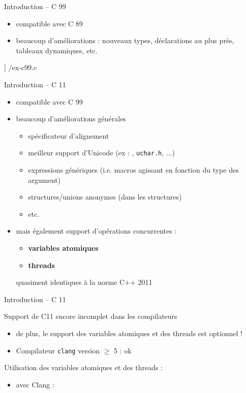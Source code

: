\begin {frame} [fragile] {Introduction -- C 99}
    \begin {itemize}
	\item compatible avec C 89
	\item beaucoup d'améliorations : nouveaux types, déclarations
	    au plus près, tableaux dynamiques, etc.
    \end {itemize}

    \scriptsize\lstmonstyle] {\inc/ex-c99.c}
\end{frame}

\begin {frame} {Introduction -- C 11}
    \begin {itemize}
	\item compatible avec C 99
	\item beaucoup d'améliorations générales
	    \begin {itemize}
		\item spécificateur d'alignement
		\item meilleur support d'Unicode (ex : ,
		    \texttt {uchar.h}, ...)
		\item expressions génériques (i.e. macros agissant
		    en fonction du type des argument)
		\item structures/unions anonymes (dans les structures)
		\item etc.
	    \end {itemize}
	\item mais également support d'opérations concurrentes :
	    \begin {itemize}
		\item \textbf {variables atomiques}
		\item \textbf {threads}
	    \end {itemize}
	    \implique quasiment identiques à la norme C++ 2011
    \end {itemize}
\end{frame}

\begin {frame} {Introduction -- C 11}

    Support de C11 encore incomplet dans les compilateurs
    \begin {itemize}
	\item de plus, le support des variables atomiques et des
	    threads est optionnel !
	\item Compilateur \texttt {clang} version $\geq$ 5 : ok

    \end {itemize}

    \vspace* {3mm}

    Utilisation des variables atomiques et des threads :
    \begin {itemize}
	\item avec Clang : 
    \end {itemize}
\end {frame}


